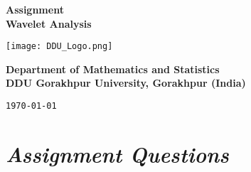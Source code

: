 \documentclass[12pt, a4paper]{article} %
\begin{document}
\begin{titlepage}
    \begin{center}
        \vspace*{1cm}

        \LARGE{\bf Assignment}\\ 
        \Large{\textbf{Wavelet Analysis}}
        

        \vspace*{1cm}

        \texttt{[image: DDU\_Logo.png]}
        \vspace*{1cm}

        \begin{center}
            {\bf Department of Mathematics and Statistics\\
        DDU Gorakhpur University, Gorakhpur (India)}
        \end{center}
        
        \vfill %

        {\tt \today}\\
    \end{center}
\end{titlepage}

\BgThispage
\tableofcontents
\thispagestyle{empty}
\clearpage

\setcounter{page}{1}


\BgThispage
\section{\slshape Assignment Questions}
\end{document}
